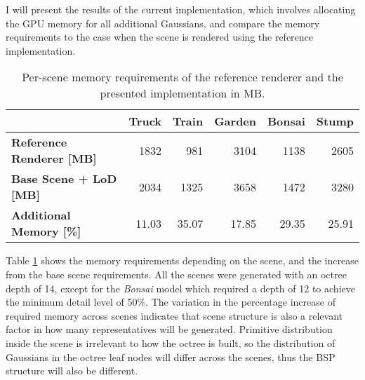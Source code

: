 I will present the results of the current implementation, which involves allocating the GPU memory for all additional Gaussians, and compare the memory requirements to the case when the scene is rendered using the reference implementation. 

\begin{table}[H]
\centering
\begin{tabular}{ll|l|l|l|l}
                                     & \textbf{Truck}             & \textbf{Train}             & \textbf{Garden}            & \textbf{Bonsai}            & \textbf{Stump}            \\ \hline
\textbf{Reference Renderer {[}MB{]}} & \multicolumn{1}{r|}{1832}  & \multicolumn{1}{r|}{981}   & \multicolumn{1}{r|}{3104}  & \multicolumn{1}{r|}{1138}  & \multicolumn{1}{r}{2605}  \\
\textbf{Base Scene + LoD {[}MB{]}}   & \multicolumn{1}{r|}{2034}  & \multicolumn{1}{r|}{1325}  & \multicolumn{1}{r|}{3658}  & \multicolumn{1}{r|}{1472}  & \multicolumn{1}{r}{3280}  \\ \hline
\textbf{Additional Memory {[}\%{]}}  & \multicolumn{1}{r|}{11.03} & \multicolumn{1}{r|}{35.07} & \multicolumn{1}{r|}{17.85} & \multicolumn{1}{r|}{29.35} & \multicolumn{1}{r}{25.91} \\                        
\end{tabular}
\caption{Per-scene memory requirements of the reference renderer and the presented implementation in MB.}
\label{tab:memory}
\end{table}

Table \ref{tab:memory} shows the memory requirements depending on the scene, and the increase from the base scene requirements. All the scenes were generated with an octree depth of 14, except for the \textit{Bonsai} model which required a depth of 12 to achieve the minimum detail level of 50\%. The variation in the percentage increase of required memory across scenes indicates that scene structure is also a relevant factor in how many representatives will be generated. Primitive distribution inside the scene is irrelevant to how the octree is built, so the distribution of Gaussians in the octree leaf nodes will differ across the scenes, thus the BSP structure will also be different.